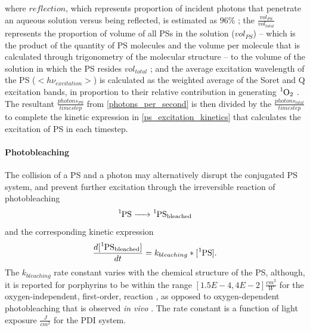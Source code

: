 where $reflection$, which represents proportion of incident photons that penetrate an aqueous solution versus being reflected, is estimated as $96 \%$ \cite{Gross1993SingletLiposomes}; the $\frac{vol_{PS}}{vol_{total}}$ represents the proportion of volume of all PSs in the solution ($vol_{PS}$) -- which is the product of the quantity of PS molecules and the volume per molecule that is calculated through trigonometry of the molecular structure -- to the volume of the solution in which the PS resides $vol_{total}$ \cite{Santos2020ApplicationAureus}; and the average excitation wavelength of the PS ($<h\nu_{excitation}>$) is calculated as the weighted average of the Soret and Q excitation bands, in proportion to their relative contribution in generating $\ce{^1O2}$ \cite{Nitzan2001PhotoinactivationWavelengths,Hoenes2020PhotoinactivationWavelength}. The resultant $\frac{photons_{PS}}{timestep}$ from \cref{photons_per_second} is then divided by the $\frac{photons_{total}}{timestep}$ to complete the kinetic expression in \cref{ps_excitation_kinetics} that calculates the excitation of PS in each timestep. 

\paragraph{Photobleaching}
The collision of a PS and a photon may alternatively disrupt the conjugated PS system, and prevent further excitation through the irreversible reaction of photobleaching
\begin{equation} \label{bleaching}
    \ce{^1PS -> ^1PS_{bleached}}
\end{equation}
and the corresponding kinetic expression
\begin{equation} \label{bleaching_kinetics}
    \frac{d[\ce{^1PS_{bleached}}]}{dt} = k_{bleaching}*[\ce{^1PS}].
\end{equation}
The $k_{bleaching}$ rate constant varies with the chemical structure of the PS, although, it is reported for porphyrins to be within the range $[1.5E-4, 4E-2] \frac{cm^2}{W}$ for the oxygen-independent, first-order, reaction \cite{Bonnett1999PhotobleachingStudy, Dysart2005CalculationCells, Mang1987PhotobleachingTherapy}, as opposed to oxygen-dependent photobleaching that is observed \textit{in vivo} \cite{Dysart2005CalculationCells}. The rate constant is a function of light exposure $\frac{J}{cm^2}$ for the PDI system.

